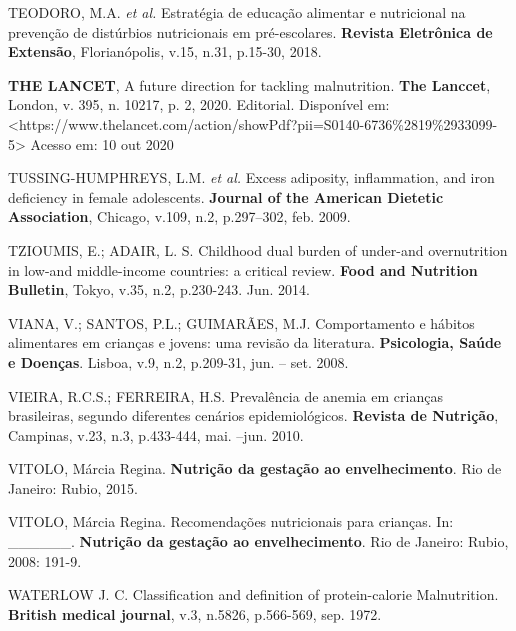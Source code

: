 \bigbreak

\noindent TEODORO, M.A. \textit{et al.} Estratégia de educação alimentar e nutricional na prevenção de distúrbios nutricionais em pré-escolares. \textbf{Revista Eletrônica de Extensão}, Florianópolis, v.15, n.31, p.15-30, 2018.

\bigbreak

\noindent \textbf{THE LANCET}, A future direction for tackling malnutrition. \textbf{The Lanccet}, London, v. 395, n. 10217, p. 2, 2020. Editorial. Disponível em: <https://www.thelancet.com/action/showPdf?pii=S0140-6736\%2819\%2933099-5> Acesso em: 10 out 2020

\bigbreak

\noindent TUSSING-HUMPHREYS, L.M. \textit{et al.} Excess adiposity, inflammation, and iron deficiency in female adolescents. \textbf{Journal of the American Dietetic Association}, Chicago, v.109, n.2, p.297–302, feb. 2009. 

\bigbreak

\noindent TZIOUMIS, E.; ADAIR, L. S. Childhood dual burden of under-and overnutrition in low-and middle-income countries: a critical review. \textbf{Food and Nutrition Bulletin}, Tokyo, v.35, n.2, p.230-243. Jun. 2014.

\bigbreak

\noindent VIANA, V.; SANTOS, P.L.; GUIMARÃES, M.J. Comportamento e hábitos alimentares em crianças e jovens: uma revisão da literatura. \textbf{Psicologia, Saúde e Doenças}. Lisboa, v.9, n.2, p.209-31, jun. – set. 2008.

\bigbreak

\noindent VIEIRA, R.C.S.; FERREIRA, H.S. Prevalência de anemia em crianças brasileiras, segundo diferentes cenários epidemiológicos. \textbf{Revista de Nutrição}, Campinas, v.23, n.3, p.433-444, mai. –jun. 2010.

\bigbreak

\noindent VITOLO, Márcia Regina. \textbf{Nutrição da gestação ao envelhecimento}. Rio de Janeiro: Rubio, 2015.

\bigbreak

\noindent VITOLO, Márcia Regina. Recomendações nutricionais para crianças. In: \_\_\_\_\_\_. \textbf{Nutrição da gestação ao envelhecimento}. Rio de Janeiro: Rubio, 2008: 191-9.

\bigbreak

\noindent WATERLOW J. C. Classification and definition of protein-calorie Malnutrition. \textbf{British medical journal}, v.3, n.5826, p.566-569, sep. 1972.

